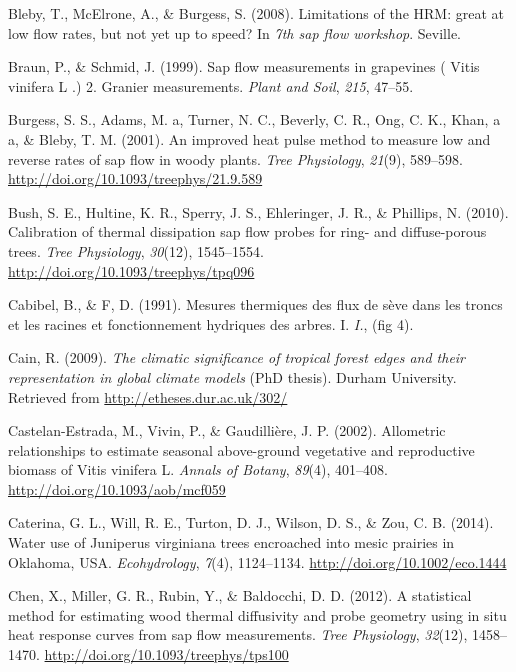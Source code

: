 \documentclass[11pt,twoside]{reedthesis}
\begin{document}
\hypertarget{ref-Bleby2008}{}
Bleby, T., McElrone, A., \& Burgess, S. (2008). Limitations of the HRM:
great at low flow rates, but not yet up to speed? In \emph{7th sap flow
workshop}. Seville.

\hypertarget{ref-Braun1999}{}
Braun, P., \& Schmid, J. (1999). Sap flow measurements in grapevines (
Vitis vinifera L .) 2. Granier measurements. \emph{Plant and Soil},
\emph{215}, 47--55.

\hypertarget{ref-Burgess2001}{}
Burgess, S. S., Adams, M. a, Turner, N. C., Beverly, C. R., Ong, C. K.,
Khan, a a, \& Bleby, T. M. (2001). An improved heat pulse method to
measure low and reverse rates of sap flow in woody plants. \emph{Tree
Physiology}, \emph{21}(9), 589--598.
\url{http://doi.org/10.1093/treephys/21.9.589}

\hypertarget{ref-Bush2010}{}
Bush, S. E., Hultine, K. R., Sperry, J. S., Ehleringer, J. R., \&
Phillips, N. (2010). Calibration of thermal dissipation sap flow probes
for ring- and diffuse-porous trees. \emph{Tree Physiology},
\emph{30}(12), 1545--1554. \url{http://doi.org/10.1093/treephys/tpq096}

\hypertarget{ref-Cabibel1991}{}
Cabibel, B., \& F, D. (1991). Mesures thermiques des flux de sève dans
les troncs et les racines et fonctionnement hydriques des arbres. I.
\emph{I.}, (fig 4).

\hypertarget{ref-Cain2009}{}
Cain, R. (2009). \emph{The climatic significance of tropical forest
edges and their representation in global climate models} (PhD thesis).
Durham University. Retrieved from \url{http://etheses.dur.ac.uk/302/}

\hypertarget{ref-Castelan-Estrada2002}{}
Castelan-Estrada, M., Vivin, P., \& Gaudillière, J. P. (2002).
Allometric relationships to estimate seasonal above-ground vegetative
and reproductive biomass of Vitis vinifera L. \emph{Annals of Botany},
\emph{89}(4), 401--408. \url{http://doi.org/10.1093/aob/mcf059}

\hypertarget{ref-Caterina2014}{}
Caterina, G. L., Will, R. E., Turton, D. J., Wilson, D. S., \& Zou, C.
B. (2014). Water use of Juniperus virginiana trees encroached into mesic
prairies in Oklahoma, USA. \emph{Ecohydrology}, \emph{7}(4), 1124--1134.
\url{http://doi.org/10.1002/eco.1444}

\hypertarget{ref-Chen2012}{}
Chen, X., Miller, G. R., Rubin, Y., \& Baldocchi, D. D. (2012). A
statistical method for estimating wood thermal diffusivity and probe
geometry using in situ heat response curves from sap flow measurements.
\emph{Tree Physiology}, \emph{32}(12), 1458--1470.
\url{http://doi.org/10.1093/treephys/tps100}
\end{document}
